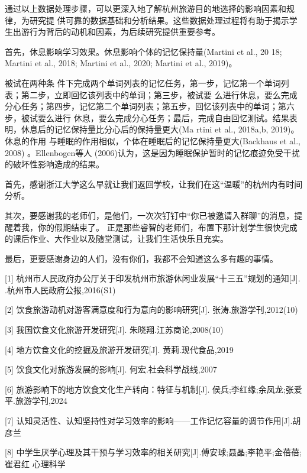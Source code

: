 \documentclass[a4paper,12pt]{article}
\begin{document}
通过以上数据处理步骤，可以更深入地了解杭州旅游目的地选择的影响因素和规律，为研究提
供可靠的数据基础和分析结果。这些数据处理过程将有助于揭示学生出游行为背后的动机和因素，为后续研究提供重要参考。

首先，休息影响学习效果。休息影响个体的记忆保持量(Martini et al., 20
18; Martini et al., 2018; Martini et al., 2020; Martini et al., 2019)。

被试在两种条
件下完成两个单词列表的记忆任务，第一步，记忆第一个单词列表；第二步，立即回忆该列表中的单词；第三步，被试要
么进行休息，要么完成分心任务；第四步，记忆第二个单词列表；第五步，回忆该列表中的单词；第六步，被试要么进行
休息，要么完成分心任务；最后，完成自由回忆测试。结果表明，休息后的记忆保持量比分心后的保持量更大(Ma
rtini et al., 2018a,b, 2019)。休息的作用
与睡眠的作用相似，个体在睡眠后的记忆保持量更大(Backhaus et al., 2008)
。Ellenbogen等人 (2006)认为，这是因为睡眠保护暂时的记忆痕迹免受干扰的破坏性影响造成的结果。


首先，感谢浙江大学这么早就让我们返回学校，让我们在这“温暖”的杭州内有时间分析。

其次，要感谢我的老师们，是他们，一次次钉钉中“你已被邀请入群聊”的消息，提醒着我，你的假期结束了。
正是那些睿智的老师们，布置下那计划学生很快完成的课后作业、大作业以及随堂测试，让我们生活快乐且充实。

最后，更要感谢身边的人们，没有你们，我都不会知道这么多有趣的事情。



[1] 杭州市人民政府办公厅关于印发杭州市旅游休闲业发展“十三五”规划的通知[J]. .杭州市人民政府公报,2016(S1)

[2] 饮食旅游动机对游客满意度和行为意向的影响研究[J]. 张涛.旅游学刊,2012(10)

[3] 我国饮食文化旅游开发研究[J]. 朱晓翔.江苏商论,2008(10)

[4] 地方饮食文化的挖掘及旅游开发研究[J]. 黄莉.现代食品,2019

[5] 饮食文化对旅游发展的影响[J]. 何宏.社会科学战线,2007

[6] 旅游影响下的地方饮食文化生产转向：特征与机制[J]. 侯兵;李红缘;余凤龙;张爱平.旅游学刊,2024

[7] 认知灵活性、认知坚持性对学习效率的影响——工作记忆容量的调节作用[J].胡彦兰

[8] 中学生厌学心理及其干预与学习效率的相关研究[J].傅安球;聂晶;李艳平;金蓓蓓;崔君红 心理科学
\end{document}
